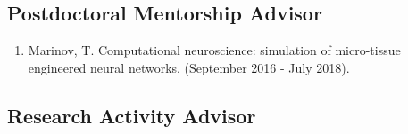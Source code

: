 \documentclass[
]{article}
\begin{document}
\subsection{Postdoctoral Mentorship Advisor}\label{postdoctoral-mentorship-advisor}

\begin{enumerate}
  \def\labelenumi{\arabic{enumi}.}
    \item Marinov, T. Computational neuroscience: simulation of micro-tissue engineered neural networks. (September 2016 - July 2018).
\end{enumerate}

\subsection{Research Activity Advisor}\label{research-activity-advisor}
\end{document}
